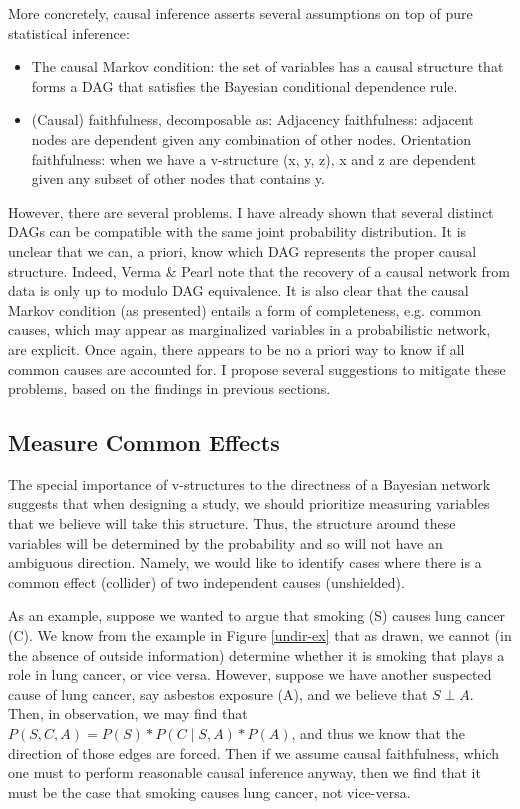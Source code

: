 \documentclass{article}
\begin{document}
	More concretely, causal inference asserts several assumptions on top of pure statistical inference\cite{ramsey2012adjacencyfaithfulness}:
	\begin{itemize}
		\item The causal Markov condition: the set of variables has a causal structure that forms a DAG that satisfies the Bayesian conditional dependence rule.
		\item (Causal) faithfulness, decomposable as:
			\subitem Adjacency faithfulness: adjacent nodes are dependent given any combination of other nodes.
			\subitem Orientation faithfulness: when we have a v-structure (x, y, z), x and z are dependent given any subset of other nodes that contains y.
	\end{itemize}
	However, there are several problems.
	I have already shown that several distinct DAGs can be compatible with the same joint probability distribution.
	It is unclear that we can, a priori, know which DAG represents the proper causal structure.
	Indeed, Verma \& Pearl note that the recovery of a causal network from data is only up to modulo DAG equivalence\cite{verma2013equivalence}.
	It is also clear that the causal Markov condition (as presented) entails a form of completeness, e.g. common causes, which may appear as marginalized variables in a probabilistic network, are explicit.
	Once again, there appears to be no a priori way to know if all common causes are accounted for. I propose several suggestions to mitigate these problems, based on the findings in previous sections.
	
	\subsection{Measure Common Effects}
	The special importance of v-structures to the directness of a Bayesian network suggests that when designing a study, we should prioritize measuring variables that we believe will take this structure.
	Thus, the structure around these variables will be determined by the probability and so will not have an ambiguous direction.
	Namely, we would like to identify cases where there is a common effect (collider) of two independent causes (unshielded).
	
	As an example, suppose we wanted to argue that smoking (S) causes lung cancer (C).
	We know from the example in Figure \ref{undir-ex} that as drawn, we cannot (in the absence of outside information) determine whether it is smoking that plays a role in lung cancer, or vice versa.
	However, suppose we have another suspected cause of lung cancer, say asbestos exposure (A), and we believe that $S \perp A$.
	Then, in observation, we may find that $P(S, C, A) = P(S)*P(C \mid S, A)*P(A)$, and thus we know that the direction of those edges are forced.
	Then if we assume causal faithfulness, which one must to perform reasonable causal inference anyway, then we find that it must be the case that smoking causes lung cancer, not vice-versa.
	
\end{document}
